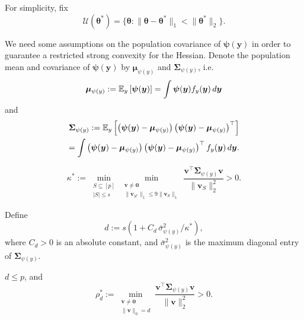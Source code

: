 \documentclass[11pt]{article}
\numberwithin{equation}{section}
\numberwithin{theorem}{section}
\def\fatv{\boldsymbol{v}}
\def\faty{\boldsymbol{y}}
\def\fatmu{\boldsymbol{\mu}}
\def\fattheta{\boldsymbol{\theta}}
\def\fatpsi{\boldsymbol{\psi}}
\def\fatSigma{\boldsymbol{\Sigma}}
\theoremstyle{definition}
\theoremstyle{remark}
\begin{document}
\noindent
For simplicity, fix
\begin{equation}
\mathcal{U}(\fattheta^*) = \{ \fattheta : \|\fattheta - \fattheta^*\|_1 < \|\fattheta^*\|_2 \}.
\end{equation}

We need some assumptions on the population covariance of $\fatpsi(\faty)$ in order to guarantee a restricted strong convexity for the Hessian.
Denote the population mean and covariance of $\fatpsi(\faty)$ by $\fatmu_{\psi(y)}$ and $\fatSigma_{\psi(y)}$, i.e.
\begin{equation}
\fatmu_{\psi(y)}
:= \EE_y\left[ \fatpsi(\faty) \right]
= \int \fatpsi(\faty) f_y(\faty) \, d\faty
\end{equation}
and
\begin{multline}
\fatSigma_{\psi(y)}
:= \EE_y\left[ \left( \fatpsi(\faty) - \fatmu_{\psi(y)} \right) \left( \fatpsi(\faty) - \fatmu_{\psi(y)} \right)^\top \right] \\
= \int \left( \fatpsi(\faty) - \fatmu_{\psi(y)} \right) \left( \fatpsi(\faty) - \fatmu_{\psi(y)} \right)^\top f_y(\faty) \, d\faty.
\end{multline}

\begin{assumption} \label{hyp:RE}
\begin{equation}
\kappa^*
:= \min_{\substack{S \subseteq [p] \\ |S| \leq s}} \min_{\substack{\fatv \neq \mathbf{0} \\ \|\fatv_{S^c}\|_1 \leq 9\|\fatv_S\|_1}} \frac{\fatv^\top \fatSigma_{\psi(y)} \fatv}{\|\fatv_S\|_2^2}
> 0.
\end{equation}
\end{assumption}

\noindent
Define
\begin{equation}
d:= s\left( 1 + C_d \, \bar\sigma_{\psi(y)}^2 / \kappa^* \right),
\end{equation}
where $C_d > 0$ is an absolute constant, and $\bar\sigma_{\psi(y)}^2$ is the maximum diagonal entry of $\fatSigma_{\psi(y)}$.

\begin{assumption} \label{hyp:min_sparse_eigval}
$d \leq p$, and
\begin{equation}
\rho_d^*
:= \min_{\substack{\fatv \neq \mathbf{0} \\ \|\fatv\|_0 = d}} \frac{\fatv^\top \fatSigma_{\psi(y)} \fatv}{\|\fatv\|_2^2} > 0.
\end{equation}
\end{assumption}
\end{document}
